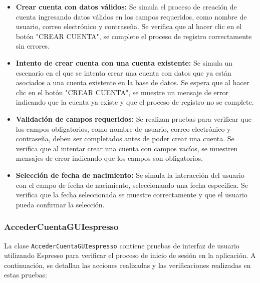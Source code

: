 \documentclass{article}
\begin{document}
\begin{itemize}
    \item \textbf{Crear cuenta con datos válidos:} Se simula el proceso de creación de cuenta ingresando datos válidos en los campos requeridos, como nombre de usuario, correo electrónico y contraseña. Se verifica que al hacer clic en el botón "CREAR CUENTA", se complete el proceso de registro correctamente sin errores.
    
    \item \textbf{Intento de crear cuenta con una cuenta existente:} Se simula un escenario en el que se intenta crear una cuenta con datos que ya están asociados a una cuenta existente en la base de datos. Se espera que al hacer clic en el botón "CREAR CUENTA", se muestre un mensaje de error indicando que la cuenta ya existe y que el proceso de registro no se complete.
    
    \item \textbf{Validación de campos requeridos:} Se realizan pruebas para verificar que los campos obligatorios, como nombre de usuario, correo electrónico y contraseña, deben ser completados antes de poder crear una cuenta. Se verifica que al intentar crear una cuenta con campos vacíos, se muestren mensajes de error indicando que los campos son obligatorios.
    
    \item \textbf{Selección de fecha de nacimiento:} Se simula la interacción del usuario con el campo de fecha de nacimiento, seleccionando una fecha específica. Se verifica que la fecha seleccionada se muestre correctamente y que el usuario pueda confirmar la selección.
\end{itemize}

\subsubsection{AccederCuentaGUIespresso}

La clase \texttt{AccederCuentaGUIespresso} contiene pruebas de interfaz de usuario utilizando Espresso para verificar el proceso de inicio de sesión en la aplicación. A continuación, se detallan las acciones realizadas y las verificaciones realizadas en estas pruebas:
\end{document}

